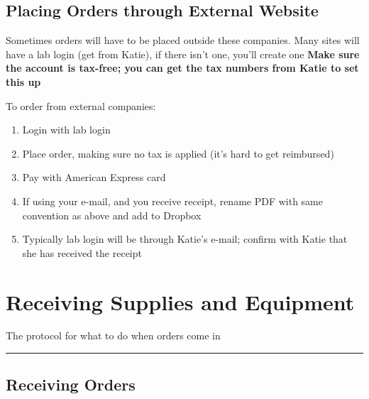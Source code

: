 \documentclass[
  letterpaper,
  DIV=11,
  numbers=noendperiod]{scrreprt}
\begin{document}
\hypertarget{placing-orders-through-external-website}{%
\section*{\texorpdfstring{\textbf{Placing Orders through External
Website}}{Placing Orders through External Website}}\label{placing-orders-through-external-website}}

Sometimes orders will have to be placed outside these companies. Many
sites will have a lab login (get from Katie), if there isn't one, you'll
create one \textbf{Make sure the account is tax-free; you can get the
tax numbers from Katie to set this up}

To order from external companies:

\begin{enumerate}
\def\labelenumi{\arabic{enumi}.}
\item
  Login with lab login
\item
  Place order, making sure no tax is applied (it's hard to get
  reimbursed)
\item
  Pay with American Express card
\item
  If using your e-mail, and you receive receipt, rename PDF with same
  convention as above and add to Dropbox
\item
  Typically lab login will be through Katie's e-mail; confirm with Katie
  that she has received the receipt
\end{enumerate}

\hypertarget{receiving-supplies-and-equipment}{%
\chapter{Receiving Supplies and
Equipment}\label{receiving-supplies-and-equipment}}

The protocol for what to do when orders come in

\begin{center}\rule{0.5\linewidth}{0.5pt}\end{center}

\hypertarget{receiving-orders}{%
\section*{\texorpdfstring{\textbf{Receiving
Orders}}{Receiving Orders}}\label{receiving-orders}}
\end{document}

